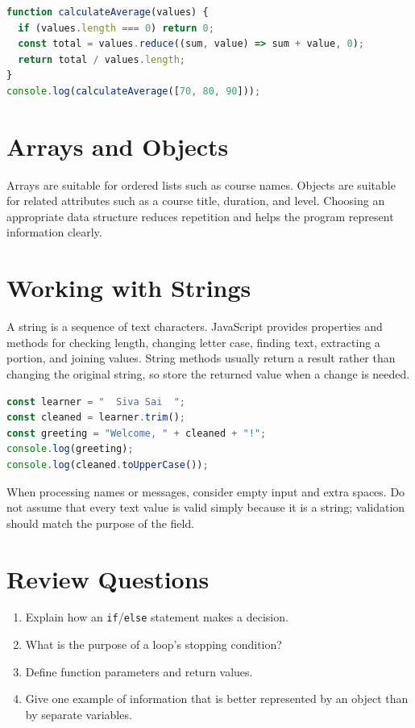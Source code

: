 \documentclass[11pt,openany,oneside]{book}
\begin{document}
\begin{lstlisting}[style=webcode,language=JavaScript]
function calculateAverage(values) {
  if (values.length === 0) return 0;
  const total = values.reduce((sum, value) => sum + value, 0);
  return total / values.length;
}
console.log(calculateAverage([70, 80, 90]));
\end{lstlisting}

\section{Arrays and Objects}
Arrays are suitable for ordered lists such as course names. Objects are suitable for related attributes such as a course title, duration, and level. Choosing an appropriate data structure reduces repetition and helps the program represent information clearly.


\section{Working with Strings}
A string is a sequence of text characters. JavaScript provides properties and methods for checking length, changing letter case, finding text, extracting a portion, and joining values. String methods usually return a result rather than changing the original string, so store the returned value when a change is needed.

\begin{lstlisting}[style=webcode,language=JavaScript]
const learner = "  Siva Sai  ";
const cleaned = learner.trim();
const greeting = "Welcome, " + cleaned + "!";
console.log(greeting);
console.log(cleaned.toUpperCase());
\end{lstlisting}
When processing names or messages, consider empty input and extra spaces. Do not assume that every text value is valid simply because it is a string; validation should match the purpose of the field.

\section*{Review Questions}
\begin{enumerate}
\item Explain how an \texttt{if}/\texttt{else} statement makes a decision.
\item What is the purpose of a loop's stopping condition?
\item Define function parameters and return values.
\item Give one example of information that is better represented by an object than by separate variables.
\end{enumerate}
\end{document}
